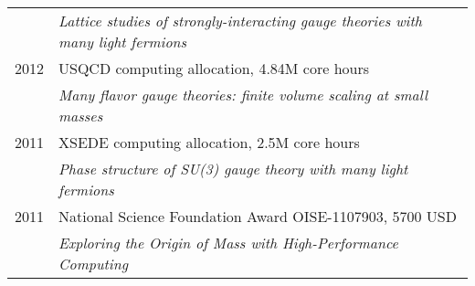 \begin{spacelistout}
\begin{tabular}[t]{cl}
           & \textit{Lattice studies of strongly-interacting gauge theories with many light fermions}                                                                                                                                  \\[6 pt]
      2012 & USQCD computing allocation, 4.84M core hours                                                                                                                                                                              \\ %
           & \textit{Many flavor gauge theories: finite volume scaling at small masses}                                                                                                                                                \\[6 pt]
      2011 & XSEDE computing allocation, 2.5M core hours                                                                                                                                                                               \\ %
           & \textit{Phase structure of SU(3) gauge theory with many light fermions}                                                                                                                                                   \\[6 pt]
      2011 & National Science Foundation Award OISE-1107903, 5700 USD                                                                                                                                                                  \\
           & \textit{Exploring the Origin of Mass with High-Performance Computing}                                                                                                                                                     \\
    \end{tabular}


\end{spacelistout}
